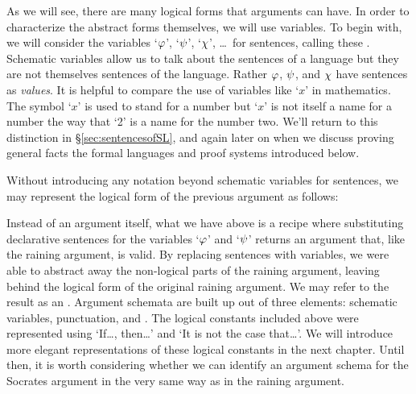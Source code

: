 \begin{earg}
\end{earg}

As we will see, there are many logical forms that arguments can have.
In order to characterize the abstract forms themselves, we will use variables.
To begin with, we will consider the variables `$\varphi$', `$\psi$', `$\chi$', \ldots\ for sentences, calling these .
Schematic variables allow us to talk about the sentences of a language but they are not themselves sentences of the language.
Rather $\varphi$, $\psi$, and $\chi$ have sentences as \textit{values}.
It is helpful to compare the use of variables like `$x$' in mathematics.
The symbol `$x$' is used to stand for a number but `$x$' is not itself a name for a number the way that `2' is a name for the number two.
We'll return to this distinction in \S\ref{sec:sentencesofSL}, and again later on when we discuss proving general facts the formal languages and proof systems introduced below.

Without introducing any notation beyond schematic variables for sentences, we may represent the logical form of the previous argument as follows:

\begin{earg}
\end{earg}

Instead of an argument itself, what we have above is a recipe where substituting declarative sentences for the variables `$\varphi$' and `$\psi$' returns an argument that, like the raining argument, is valid.
By replacing sentences with variables, we were able to abstract away the non-logical parts of the raining argument, leaving behind the logical form of the original raining argument.
We may refer to the result as an .
Argument schemata are built up out of three elements: schematic variables, punctuation, and .
The logical constants included above were represented using `If\ldots, then\ldots' and `It is not the case that\ldots'.
We will introduce more elegant representations of these logical constants in the next chapter.
Until then, it is worth considering whether we can identify an argument schema for the Socrates argument in the very same way as in the raining argument.

